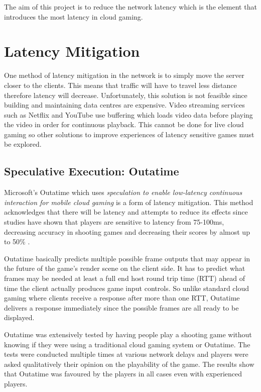 The aim of this project is to reduce the network latency which is the element that introduces the most latency in cloud gaming.

\section{Latency Mitigation}
One method of latency mitigation in the network is to simply move the server closer to the clients. This means that traffic will have to travel less distance therefore latency will decrease. Unfortunately, this solution is not feasible since building and maintaining data centres are expensive. Video streaming services such as Netflix and YouTube use buffering which loads video data before playing the video in order for continuous playback. This cannot be done for live cloud gaming so other solutions to improve experiences of latency sensitive games must be explored.

\subsection{Speculative Execution: Outatime}
 Microsoft's Outatime which uses \textit{speculation to enable low-latency continuous interaction for mobile cloud gaming} \cite{lee2015outatime} is a form of latency mitigation. This method acknowledges that there will be latency and attempts to reduce its effects since studies have shown that players are sensitive to latency from 75-100ms, decreasing accuracy in shooting games and decreasing their scores by almost up to 50\% \cite{beigbeder2004effects}.
\newline 
\par
Outatime basically predicts multiple possible frame outputs that may appear in the future of the game's render scene on the client side. It has to predict what frames may be needed at least a full end host round trip time (RTT) ahead of time the client actually produces game input controls. So unlike standard cloud gaming where clients receive a response after more than one RTT, Outatime delivers a response immediately since the possible frames are all ready to be displayed.
\newline
\par
Outatime was extensively tested by having people play a shooting game without knowing if they were using a traditional cloud gaming system or Outatime. The tests were conducted multiple times at various network delays and players were asked qualitatively their opinion on the playability of the game. The results show that Outatime was favoured by the players in all cases even with experienced players.

